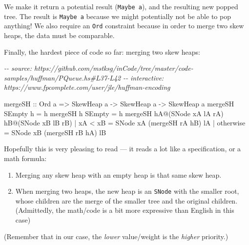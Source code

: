 \documentclass[]{article}
\newenvironment{Shaded}{}{}
\newcommand{\CommentTok}[1]{\textcolor[rgb]{0.38,0.63,0.69}{\textit{#1}}}
\newcommand{\DataTypeTok}[1]{\textcolor[rgb]{0.56,0.13,0.00}{#1}}
\newcommand{\FunctionTok}[1]{\textcolor[rgb]{0.02,0.16,0.49}{#1}}
\newcommand{\NormalTok}[1]{#1}
\newcommand{\OperatorTok}[1]{\textcolor[rgb]{0.40,0.40,0.40}{#1}}
\newcommand{\OtherTok}[1]{\textcolor[rgb]{0.00,0.44,0.13}{#1}}
\begin{document}
We make it return a potential result (\texttt{Maybe\ a}), and the resulting new
popped tree. The result is \texttt{Maybe\ a} because we might potentially not be
able to pop anything! We also require an \texttt{Ord} constraint because in
order to merge two skew heaps, the data must be comparable.

Finally, the hardest piece of code so far: merging two skew heaps:

\begin{Shaded}
\begin{Highlighting}[]
\CommentTok{{-}{-} source: https://github.com/mstksg/inCode/tree/master/code{-}samples/huffman/PQueue.hs\#L37{-}L42}
\CommentTok{{-}{-} interactive: https://www.fpcomplete.com/user/jle/huffman{-}encoding}

\OtherTok{mergeSH ::} \DataTypeTok{Ord}\NormalTok{ a }\OtherTok{=\textgreater{}} \DataTypeTok{SkewHeap}\NormalTok{ a }\OtherTok{{-}\textgreater{}} \DataTypeTok{SkewHeap}\NormalTok{ a }\OtherTok{{-}\textgreater{}} \DataTypeTok{SkewHeap}\NormalTok{ a}
\NormalTok{mergeSH }\DataTypeTok{SEmpty}\NormalTok{ h }\OtherTok{=}\NormalTok{ h}
\NormalTok{mergeSH h }\DataTypeTok{SEmpty} \OtherTok{=}\NormalTok{ h}
\NormalTok{mergeSH hA}\OperatorTok{@}\NormalTok{(}\DataTypeTok{SNode}\NormalTok{ xA lA rA) hB}\OperatorTok{@}\NormalTok{(}\DataTypeTok{SNode}\NormalTok{ xB lB rB)}
    \OperatorTok{|}\NormalTok{ xA }\OperatorTok{\textless{}}\NormalTok{ xB    }\OtherTok{=} \DataTypeTok{SNode}\NormalTok{ xA (mergeSH rA hB) lA}
    \OperatorTok{|} \FunctionTok{otherwise}  \OtherTok{=} \DataTypeTok{SNode}\NormalTok{ xB (mergeSH rB hA) lB}
\end{Highlighting}
\end{Shaded}

Hopefully this is very pleasing to read --- it reads a lot like a specification,
or a math formula:

\begin{enumerate}
\def\labelenumi{\arabic{enumi}.}
\tightlist
\item
  Merging any skew heap with an empty heap is that same skew heap.
\item
  When merging two heaps, the new heap is an \texttt{SNode} with the smaller
  root, whose children are the merge of the smaller tree and the original
  children. (Admittedly, the math/code is a bit more expressive than English in
  this case)
\end{enumerate}

(Remember that in our case, the \emph{lower} value/weight is the \emph{higher}
priority.)
\end{document}
